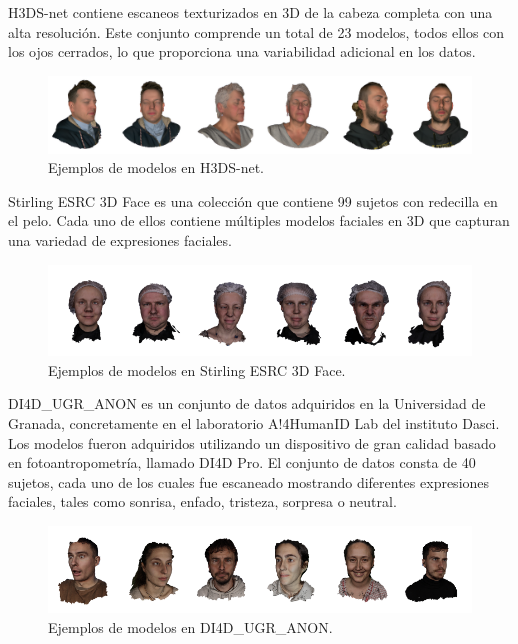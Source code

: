 H3DS-net \cite{61} contiene escaneos texturizados en 3D de la cabeza completa con una alta resolución. Este conjunto comprende un total de 23 modelos, todos ellos con los ojos cerrados, lo que proporciona una variabilidad adicional en los datos.

\begin{figure}[h]
	\centering
	\includegraphics[scale=0.18]{imagenes/cap4/h3dsnet.png}
	\caption[Ejemplos H3DS-net.]{Ejemplos de modelos en H3DS-net.}
	\label{fig18}
\end{figure}

Stirling ESRC 3D Face es una colección que contiene 99 sujetos con redecilla en el pelo. Cada uno de ellos contiene múltiples modelos faciales en 3D que capturan una variedad de expresiones faciales.

\begin{figure}[h]
	\centering
	\includegraphics[scale=0.85]{imagenes/cap4/stirling.png}
	\caption[Ejemplos Stirling ESRC 3D Face.]{Ejemplos de modelos en Stirling ESRC 3D Face.}
	\label{fig18.1}
\end{figure}

DI4D\_UGR\_ANON es un conjunto de datos adquiridos en la Universidad de Granada, concretamente en el laboratorio A!4HumanID Lab del instituto Dasci. Los modelos fueron adquiridos utilizando un dispositivo de gran calidad basado en fotoantropometría, llamado DI4D Pro. El conjunto de datos consta de 40 sujetos, cada uno de los cuales fue escaneado mostrando diferentes expresiones faciales, tales como sonrisa, enfado, tristeza, sorpresa o neutral.

\begin{figure}[h]
	\centering
	\includegraphics[scale=0.8]{imagenes/cap4/di4d.png}
	\caption[Ejemplos DI4D\_UGR\_ANON.]{Ejemplos de modelos en DI4D\_UGR\_ANON.}
	\label{fig18.2}
\end{figure}

